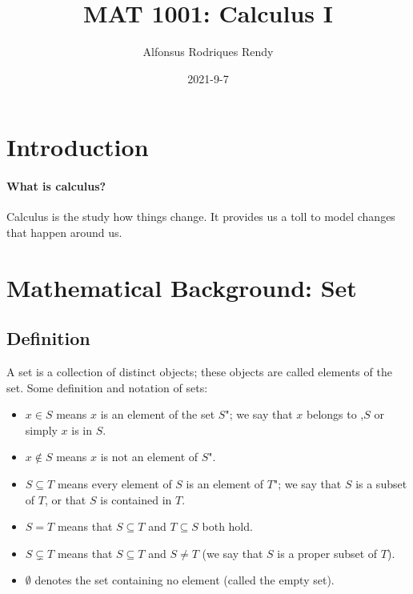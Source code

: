 \documentclass[12pt]{article}
\title{MAT 1001: Calculus I}
\author{Alfonsus Rodriques Rendy}
\date{2021-9-7}
\begin{document}
\begin{center}
    \hspace*{-0.5cm}
\end{center}

\section{Introduction}
\paragraph{What is calculus?} Calculus is the study how things change. It provides us a toll to model changes that happen around us.

\section{Mathematical Background: Set}
\subsection{Definition}
A set is a collection of distinct objects; these objects are called
elements of the set. Some definition and notation of sets:
\begin{itemize}
    \item $x \in S$ means $x$ is an element of the set $S$"; we say that $x$ belongs to ,$S$ or simply $x$ is in $S$.
    \item $x \notin S$ means $x$ is not an element of $S$".
    \item $S \subseteq T$ means every element of $S$ is an element of $T$"; we say that $S$ is a subset of $T$, or that $S$ is contained in $T$.
    \item $S = T$ means that $S \subseteq T$ and $T \subseteq S$ both hold.
    \item $S \subsetneq T$ means that $S \subseteq T$ and $S \neq T$ (we say that $S$ is a proper subset of $T$).
    \item $ \emptyset $ denotes the set containing no element (called the empty set).
\end{itemize}
\end{document}
